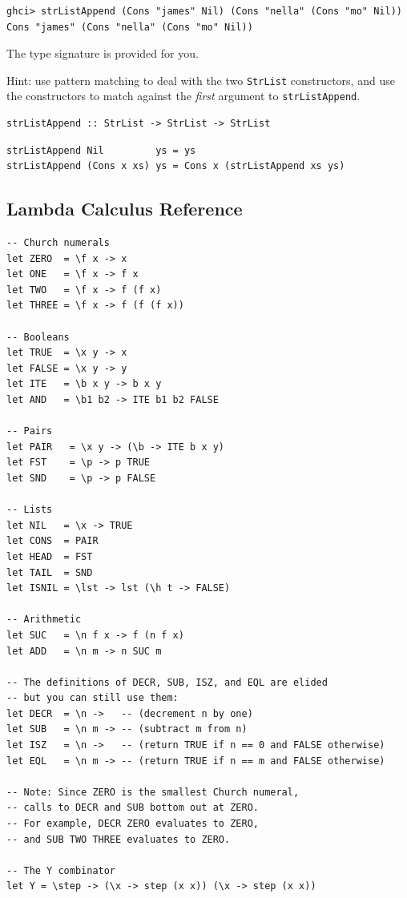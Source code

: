\documentclass[addpoints,answers]{exam}
\begin{document}
\begin{questions}
\begin{verbatim}
ghci> strListAppend (Cons "james" Nil) (Cons "nella" (Cons "mo" Nil))
Cons "james" (Cons "nella" (Cons "mo" Nil))
\end{verbatim}

The type signature is provided for you.

Hint: use pattern matching to deal with the two \verb|StrList| constructors, and use the constructors to match against the \emph{first} argument to \verb|strListAppend|.

\begin{verbatim}
strListAppend :: StrList -> StrList -> StrList
\end{verbatim}
\begin{solutionorbox}[3in]
\begin{verbatim}
strListAppend Nil         ys = ys
strListAppend (Cons x xs) ys = Cons x (strListAppend xs ys)
\end{verbatim}
\end{solutionorbox}

\end{questions}

\newpage

\subsection*{Lambda Calculus Reference}

\begin{verbatim}
-- Church numerals
let ZERO  = \f x -> x
let ONE   = \f x -> f x
let TWO   = \f x -> f (f x)
let THREE = \f x -> f (f (f x))

-- Booleans
let TRUE  = \x y -> x
let FALSE = \x y -> y
let ITE   = \b x y -> b x y
let AND   = \b1 b2 -> ITE b1 b2 FALSE

-- Pairs
let PAIR   = \x y -> (\b -> ITE b x y)
let FST    = \p -> p TRUE
let SND    = \p -> p FALSE

-- Lists
let NIL   = \x -> TRUE
let CONS  = PAIR
let HEAD  = FST
let TAIL  = SND
let ISNIL = \lst -> lst (\h t -> FALSE)

-- Arithmetic
let SUC   = \n f x -> f (n f x)
let ADD   = \n m -> n SUC m

-- The definitions of DECR, SUB, ISZ, and EQL are elided
-- but you can still use them:
let DECR  = \n ->   -- (decrement n by one)
let SUB   = \n m -> -- (subtract m from n)
let ISZ   = \n ->   -- (return TRUE if n == 0 and FALSE otherwise)
let EQL   = \n m -> -- (return TRUE if n == m and FALSE otherwise)

-- Note: Since ZERO is the smallest Church numeral,
-- calls to DECR and SUB bottom out at ZERO.
-- For example, DECR ZERO evaluates to ZERO,
-- and SUB TWO THREE evaluates to ZERO.

-- The Y combinator
let Y = \step -> (\x -> step (x x)) (\x -> step (x x))
\end{verbatim}
\end{document}
